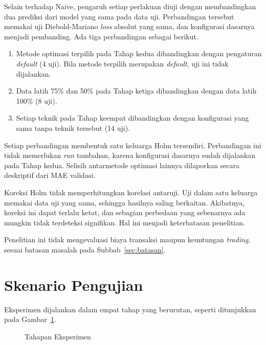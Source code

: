 Selain terhadap Naive, pengaruh setiap perlakuan diuji dengan membandingkan
dua prediksi dari model yang sama pada data uji. Perbandingan tersebut
memakai uji Diebold-Mariano \textit{loss} absolut yang sama, dan konfigurasi
dasarnya menjadi pembanding. Ada tiga perbandingan sebagai berikut.
\begin{enumerate}
  \item Metode optimasi terpilih pada Tahap kedua dibandingkan dengan
    pengaturan \textit{default} (4 uji). Bila metode terpilih merupakan
    \textit{default}, uji ini tidak dijalankan.
  \item Data latih 75\% dan 50\% pada Tahap ketiga dibandingkan dengan data
    latih 100\% (8 uji).
  \item Setiap teknik pada Tahap keempat dibandingkan dengan konfigurasi yang
    sama tanpa teknik tersebut (14 uji).
\end{enumerate}
Setiap perbandingan membentuk satu keluarga Holm tersendiri. Perbandingan ini
tidak memerlukan \textit{run} tambahan, karena konfigurasi dasarnya sudah
dijalankan pada Tahap kedua. Selisih antarmetode optimasi lainnya dilaporkan
secara deskriptif dari MAE validasi.

Koreksi Holm tidak memperhitungkan korelasi antaruji. Uji dalam satu keluarga
memakai data uji yang sama, sehingga hasilnya saling berkaitan. Akibatnya,
koreksi ini dapat terlalu ketat, dan sebagian perbedaan yang sebenarnya ada
mungkin tidak terdeteksi signifikan. Hal ini menjadi keterbatasan penelitian.

Penelitian ini tidak mengevaluasi biaya transaksi maupun keuntungan \textit{trading},
sesuai batasan masalah pada Subbab~\ref{sec:batasan}.



\section{Skenario Pengujian}
\label{sec:skenario}
Eksperimen dijalankan dalam empat tahap yang berurutan, seperti ditunjukkan pada Gambar~\ref{fig:tahap}.

\begin{figure}[!htbp]
  \centering
  \caption{Tahapan Eksperimen}
  \label{fig:tahap}
\end{figure}

